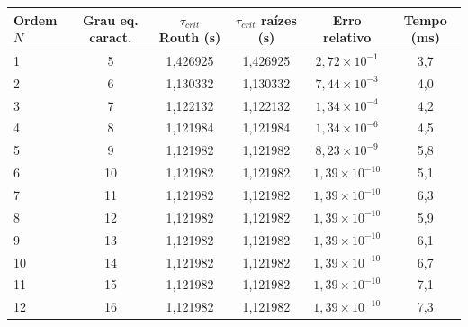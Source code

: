 \begin{tabular}{lccccc}
\hline
Ordem $N$ & Grau eq. caract. & $\tau_{crit}$ Routh (s) & $\tau_{crit}$ raízes (s) & Erro relativo & Tempo (ms) \\
\hline
1 & 5 & 1{,}426925 & 1{,}426925 & $2{,}72 \times 10^{-1}$ & 3{,}7 \\
2 & 6 & 1{,}130332 & 1{,}130332 & $7{,}44 \times 10^{-3}$ & 4{,}0 \\
3 & 7 & 1{,}122132 & 1{,}122132 & $1{,}34 \times 10^{-4}$ & 4{,}2 \\
4 & 8 & 1{,}121984 & 1{,}121984 & $1{,}34 \times 10^{-6}$ & 4{,}5 \\
5 & 9 & 1{,}121982 & 1{,}121982 & $8{,}23 \times 10^{-9}$ & 5{,}8 \\
6 & 10 & 1{,}121982 & 1{,}121982 & $1{,}39 \times 10^{-10}$ & 5{,}1 \\
7 & 11 & 1{,}121982 & 1{,}121982 & $1{,}39 \times 10^{-10}$ & 6{,}3 \\
8 & 12 & 1{,}121982 & 1{,}121982 & $1{,}39 \times 10^{-10}$ & 5{,}9 \\
9 & 13 & 1{,}121982 & 1{,}121982 & $1{,}39 \times 10^{-10}$ & 6{,}1 \\
10 & 14 & 1{,}121982 & 1{,}121982 & $1{,}39 \times 10^{-10}$ & 6{,}7 \\
11 & 15 & 1{,}121982 & 1{,}121982 & $1{,}39 \times 10^{-10}$ & 7{,}1 \\
12 & 16 & 1{,}121982 & 1{,}121982 & $1{,}39 \times 10^{-10}$ & 7{,}3 \\
\hline
\end{tabular}
